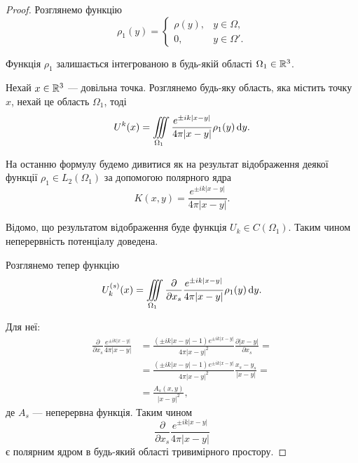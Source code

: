 \begin{proof}
	Розглянемо функцію
	\begin{equation}
		\rho_1(y) = \begin{cases}
			\rho(y), & y \in \Omega, \\
			0, & y \in \Omega'.
		\end{cases}	
	\end{equation}

	Функція $\rho_1$ залишається інтегрованою в будь-якій області $\Omega_1 \in \mathbb{R}^3$. \medskip

	Нехай $x \in \mathbb{R}^3$ --- довільна точка. Розглянемо будь-яку область, яка містить точку $x$, нехай це область $\Omega_1$, тоді
	\begin{equation}
		U^k(x) = \displaystyle\iiint\limits_{\Omega_1} \frac{e^{\pm i k |x - y|}}{4 \pi |x - y|} \rho_1(y) \mathop{}\!\mathrm{d} y.
	\end{equation}

	На останню формулу будемо дивитися як на результат відображення деякої функції $\rho_1 \in L_2(\Omega_1)$ за допомогою полярного ядра
	\begin{equation}
		K(x, y) = \frac{e^{\pm i k |x - y|}}{4 \pi |x - y|}.
	\end{equation}

	Відомо, що результатом відображення буде функція $U_k \in C(\Omega_1)$.  Таким чином неперервність потенціалу доведена. \medskip

	Розглянемо тепер функцію
	\begin{equation}
		U_k^{(s)}(x) = \displaystyle\iiint\limits_{\Omega_1} \frac{\partial}{\partial x_s} \frac{e^{\pm i k |x - y|}}{4 \pi |x - y|} \rho_1(y) \mathop{}\!\mathrm{d} y.
	\end{equation}

	Для неї:
	\begin{equation}
		\begin{aligned}
			\frac{\partial}{\partial x_s} \frac{e^{\pm i k |x - y|}}{4 \pi |x - y|} &= \frac{(\pm i k |x - y| - 1) e^{\pm i k |x - y|}}{4 \pi |x - y|^2} \frac{\partial |x - y|}{\partial x_s} = \\
			&= \frac{(\pm i k |x - y| - 1) e^{\pm i k |x - y|}}{4 \pi |x - y|^2} \frac{x_s - y_s}{|x - y|} = \\
			&= \frac{A_s(x, y)}{|x - y|^2},
		\end{aligned}
	\end{equation} 
	де $A_s$ --- неперервна функція. Таким чином
	\begin{equation}
		\frac{\partial}{\partial x_s} \frac{e^{\pm i k |x - y|}}{4 \pi |x - y|}	
	\end{equation}
	є полярним ядром в будь-який області тривимірного простору. \medskip


\end{proof}
